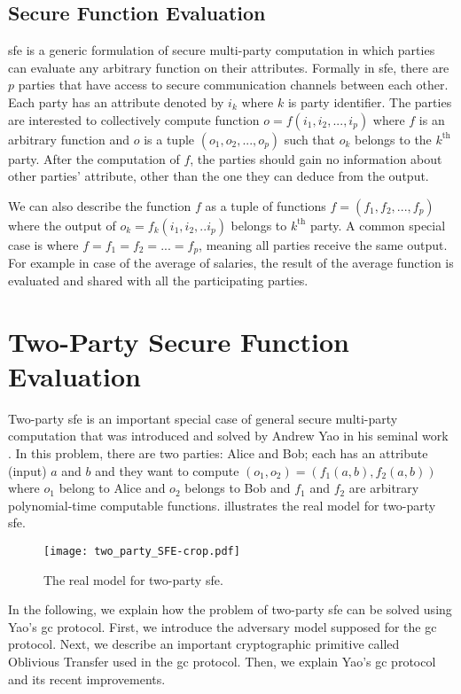 \subsection{Secure Function Evaluation}\label{ssec:prelim-sfe}
\acrfull{sfe} is a generic formulation of secure multi-party computation in which parties can evaluate any arbitrary function on their attributes.
Formally in \acrshort{sfe}, there are $p$ parties that have access to secure communication channels between each other.
Each party has an attribute denoted by $i_k$ where $k$ is party identifier.
The parties are interested to collectively compute function $o = f(i_1, i_2, ..., i_p)$ where $f$ is an arbitrary function and $o$ is a tuple $(o_1, o_2, ..., o_p)$ such that $o_k$ belongs to the $k^{\text{th}}$ party.
After the computation of $f$, the parties should gain no information about other parties' attribute, other than the one they can deduce from the output.

We can also  describe the function $f$ as a tuple of functions $f = (f_1, f_2, ...,  f_p)$ where the output of $o_k = f_k(i_1, i_2, .. i_p)$ belongs to $k^{\text{th}}$ party.
A common special case is where $f = f_1 = f_2 = ... = f_p$, meaning all parties receive the same output.
For example in case of the average of salaries, the result of the average function is evaluated and shared with all the participating parties.

\section{Two-Party Secure Function Evaluation}\label{sec:prelim-2sfe}
Two-party \acrshort{sfe} is an important special case of general secure multi-party computation that was introduced and solved by Andrew Yao in his seminal work \cite{yao1986generate}.
In this problem, there are two parties: Alice and Bob; each has an attribute (input) $a$ and $b$ and they want to compute $(o_1, o_2) = (f_1(a, b), f_2(a, b))$ where $o_1$ belong to Alice and $o_2$ belongs to Bob and $f_1$ and $f_2$ are arbitrary polynomial-time computable functions.
 illustrates the real model for two-party \acrshort{sfe}.

\begin{figure}
\centering
\texttt{[image: two\_party\_SFE-crop.pdf]}
\caption{The real model for two-party \acrfull{sfe}.}
\label{fig:two-party-sfe}
\end{figure}

In the following, we explain how the problem of two-party \acrshort{sfe} can be solved using Yao's \acrfull{gc} protocol.
First, we introduce the adversary model supposed for the \acrshort{gc} protocol.
Next, we describe an important cryptographic primitive called Oblivious Transfer used in the \acrshort{gc} protocol.
Then, we explain Yao's \acrshort{gc} protocol and its recent improvements.

